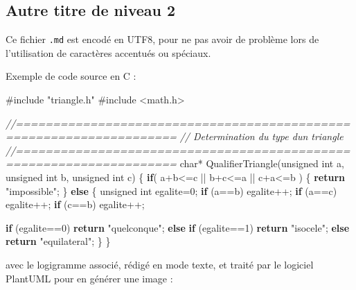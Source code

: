 \documentclass[
  10pt,
]{book}
\newenvironment{Shaded}{}{}
\newcommand{\CommentTok}[1]{\textcolor[rgb]{0.38,0.63,0.69}{\textit{#1}}}
\newcommand{\ControlFlowTok}[1]{\textcolor[rgb]{0.00,0.44,0.13}{\textbf{#1}}}
\newcommand{\DataTypeTok}[1]{\textcolor[rgb]{0.56,0.13,0.00}{#1}}
\newcommand{\DecValTok}[1]{\textcolor[rgb]{0.25,0.63,0.44}{#1}}
\newcommand{\ImportTok}[1]{#1}
\newcommand{\NormalTok}[1]{#1}
\newcommand{\PreprocessorTok}[1]{\textcolor[rgb]{0.74,0.48,0.00}{#1}}
\newcommand{\StringTok}[1]{\textcolor[rgb]{0.25,0.44,0.63}{#1}}
\begin{document}
\hypertarget{autre-titre-de-niveau-2}{%
\subsection{Autre titre de niveau 2}\label{autre-titre-de-niveau-2}}

Ce fichier \texttt{.md} est encodé en UTF8, pour ne pas avoir de
problème lors de l'utilisation de caractères accentués ou spéciaux.

Exemple de code source en C :

\begin{Shaded}
\begin{Highlighting}[]
\PreprocessorTok{\#include }\ImportTok{"triangle.h"}
\PreprocessorTok{\#include }\ImportTok{<math.h>}

\CommentTok{//====================================================================}
\CommentTok{// Determination du type d\textquotesingle{}un triangle}
\CommentTok{//====================================================================}
\DataTypeTok{char}\NormalTok{* QualifierTriangle(}\DataTypeTok{unsigned} \DataTypeTok{int}\NormalTok{ a, }\DataTypeTok{unsigned} \DataTypeTok{int}\NormalTok{ b, }\DataTypeTok{unsigned} \DataTypeTok{int}\NormalTok{ c)}
\NormalTok{\{}
    \ControlFlowTok{if}\NormalTok{( a+b<=c || b+c<=a || c+a<=b )}
\NormalTok{    \{}
        \ControlFlowTok{return} \StringTok{"impossible"}\NormalTok{;}
\NormalTok{    \}}
    \ControlFlowTok{else}
\NormalTok{    \{}
        \DataTypeTok{unsigned} \DataTypeTok{int}\NormalTok{ egalite=}\DecValTok{0}\NormalTok{;}
        \ControlFlowTok{if}\NormalTok{ (a==b) egalite++;}
        \ControlFlowTok{if}\NormalTok{ (a==c) egalite++;}
        \ControlFlowTok{if}\NormalTok{ (c==b) egalite++;}

        \ControlFlowTok{if}\NormalTok{ (egalite==}\DecValTok{0}\NormalTok{)      }\ControlFlowTok{return} \StringTok{"quelconque"}\NormalTok{;}
        \ControlFlowTok{else} \ControlFlowTok{if}\NormalTok{ (egalite==}\DecValTok{1}\NormalTok{) }\ControlFlowTok{return} \StringTok{"isocele"}\NormalTok{;}
        \ControlFlowTok{else}                 \ControlFlowTok{return} \StringTok{"equilateral"}\NormalTok{;}
\NormalTok{    \}}
\NormalTok{\}}
\end{Highlighting}
\end{Shaded}

avec le logigramme associé, rédigé en mode texte, et traité par le
logiciel PlantUML pour en générer une image :
\end{document}
